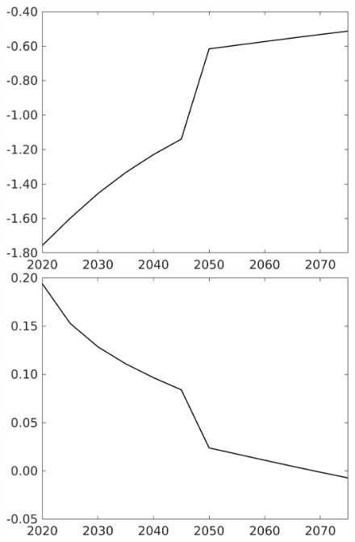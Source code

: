 \documentclass[12pt]{article}
\begin{document}
\begin{figure}[h!!]
\begin{minipage}[]{0.32\textwidth}
	\end{minipage}		
	\begin{minipage}[]{0.32\textwidth}
		\includegraphics[width=1\textwidth]{../../codding_model/own_basedOnFried/optimalPol_010922_revision/figures/all_13Sept22/CompTaufPER_bytaul_Equlab_Reg0_sg_spillover0_nsk0_xgr0_knspil0_sep1_LFlimit1_emsbase0_countec0_GovRev0_etaa0.79_lgd0.png}
	\end{minipage}
	\begin{minipage}[]{0.32\textwidth}
		\includegraphics[width=1\textwidth]{../../codding_model/own_basedOnFried/optimalPol_010922_revision/figures/all_13Sept22/CompTaufPER_bytaul_Equlab_Reg0_sn_spillover0_nsk0_xgr0_knspil0_sep1_LFlimit1_emsbase0_countec0_GovRev0_etaa0.79_lgd0.png}

\end{minipage}
\end{figure}
\end{document}
